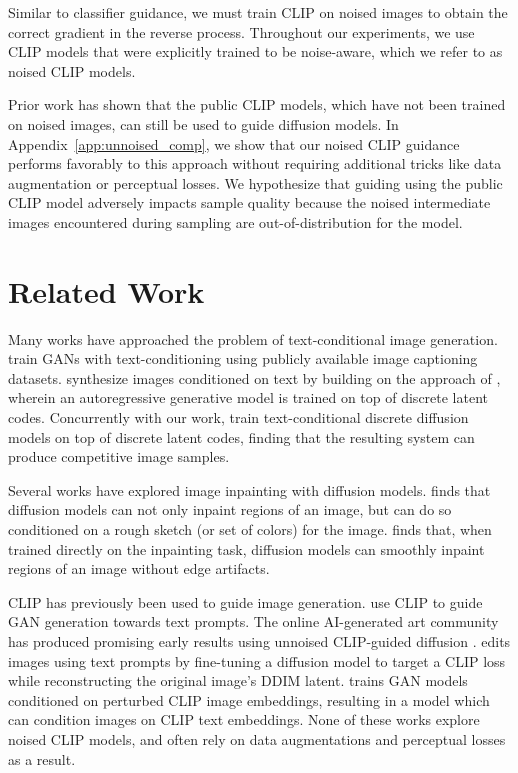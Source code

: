 \documentclass{article}
\begin{document}
Similar to classifier guidance, we must train CLIP on noised images  to obtain the correct gradient in the reverse process. Throughout our experiments, we use CLIP models that were explicitly trained to be noise-aware, which we refer to as noised CLIP models.

Prior work \citet{clipdiff,secondarymodelmethod} has shown that the public CLIP models, which have not been trained on noised images, can still be used to guide diffusion models. In Appendix~\ref{app:unnoised_comp}, we show that our noised CLIP guidance performs favorably to this approach without requiring additional tricks like data augmentation or perceptual losses. We hypothesize that guiding using the public CLIP model adversely impacts sample quality because the noised intermediate images encountered during sampling are out-of-distribution for the model.

\section{Related Work}
\label{sec:related_work}

Many works have approached the problem of text-conditional image generation. \citet{attngan,dmgan,dfgan,xmcgan,textcl} train GANs with text-conditioning using publicly available image captioning datasets. \citet{dalle} synthesize images conditioned on text by building on the approach of \citet{vqvae}, wherein an autoregressive generative model is trained on top of discrete latent codes. Concurrently with our work, \citet{vqdiff} train text-conditional discrete diffusion models on top of discrete latent codes, finding that the resulting system can produce competitive image samples.

Several works have explored image inpainting with diffusion models. \citet{sdedit} finds that diffusion models can not only inpaint regions of an image, but can do so conditioned on a rough sketch (or set of colors) for the image. \citet{palette} finds that, when trained directly on the inpainting task, diffusion models can smoothly inpaint regions of an image without edge artifacts.

CLIP has previously been used to guide image generation. \citet{clipglass,styleclip,bigsleep,stylegannada} use CLIP to guide GAN generation towards text prompts. The online AI-generated art community has produced promising early results using unnoised CLIP-guided diffusion \citep{clipdiff,secondarymodelmethod}. \citet{diffusionclip} edits images using text prompts by fine-tuning a diffusion model to target a CLIP loss while reconstructing the original image's DDIM \citep{ddim} latent. \mbox{\citet{lafite}} trains GAN models conditioned on perturbed CLIP image embeddings, resulting in a model which can condition images on CLIP text embeddings. None of these works explore noised CLIP models, and often rely on data augmentations and perceptual losses as a result.
\end{document}
